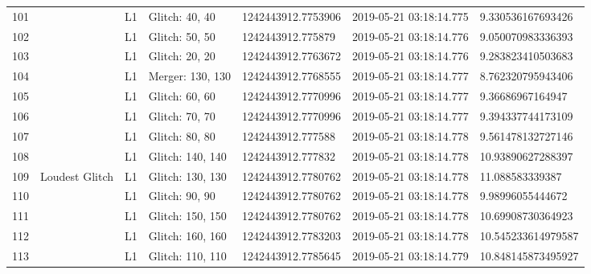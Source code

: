 \begin{longtable}{lllllll}
101  &                                                    &       L1 &    Glitch: 40, 40 &  1242443912.7753906 &  2019-05-21 03:18:14.775 &   9.330536167693426 \\
102  &                                                    &       L1 &    Glitch: 50, 50 &   1242443912.775879 &  2019-05-21 03:18:14.776 &   9.050070983336393 \\
103  &                                                    &       L1 &    Glitch: 20, 20 &  1242443912.7763672 &  2019-05-21 03:18:14.776 &   9.283823410503683 \\
104  &                                                    &       L1 &  Merger: 130, 130 &  1242443912.7768555 &  2019-05-21 03:18:14.777 &   8.762320795943406 \\
105  &                                                    &       L1 &    Glitch: 60, 60 &  1242443912.7770996 &  2019-05-21 03:18:14.777 &    9.36686967164947 \\
106  &                                                    &       L1 &    Glitch: 70, 70 &  1242443912.7770996 &  2019-05-21 03:18:14.777 &   9.394337744173109 \\
107  &                                                    &       L1 &    Glitch: 80, 80 &   1242443912.777588 &  2019-05-21 03:18:14.778 &   9.561478132727146 \\
108  &                                                    &       L1 &  Glitch: 140, 140 &   1242443912.777832 &  2019-05-21 03:18:14.778 &   10.93890627288397 \\
109  &                                     Loudest Glitch &       L1 &  Glitch: 130, 130 &  1242443912.7780762 &  2019-05-21 03:18:14.778 &     11.088583339387 \\
110  &                                                    &       L1 &    Glitch: 90, 90 &  1242443912.7780762 &  2019-05-21 03:18:14.778 &    9.98996055444672 \\
111  &                                                    &       L1 &  Glitch: 150, 150 &  1242443912.7780762 &  2019-05-21 03:18:14.778 &   10.69908730364923 \\
112  &                                                    &       L1 &  Glitch: 160, 160 &  1242443912.7783203 &  2019-05-21 03:18:14.778 &  10.545233614979587 \\
113  &                                                    &       L1 &  Glitch: 110, 110 &  1242443912.7785645 &  2019-05-21 03:18:14.779 &  10.848145873495927 \\

\end{longtable}

